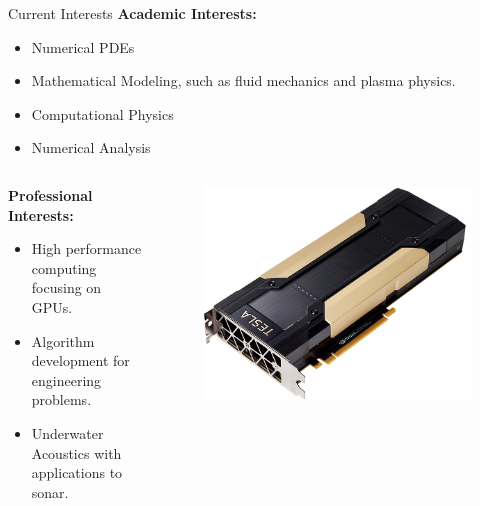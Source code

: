 \documentclass[9pt]{beamer}
\begin{document}
\begin{frame}{Current Interests}
	\textbf{Academic Interests:}
	\begin{itemize}
		\item Numerical PDEs
		
		\item Mathematical Modeling, such as fluid mechanics and plasma physics.
		
		\item Computational Physics
		
		\item Numerical Analysis
	\end{itemize}
	\vspace{1cm}
	\begin{columns}
		\begin{column}{8cm}
			\textbf{Professional Interests:}
			\begin{itemize}
				\item High performance computing focusing on GPUs.
				
				\item Algorithm development for engineering problems.
				
				\item Underwater Acoustics with applications to sonar.
			\end{itemize}
		\end{column}
		\begin{column}{2cm}
			\centering
			\begin{figure}
				\includegraphics[scale=0.1]{v100.jpg}
			\end{figure}
		\end{column}
	\end{columns}
	
\end{frame}
\end{document}
